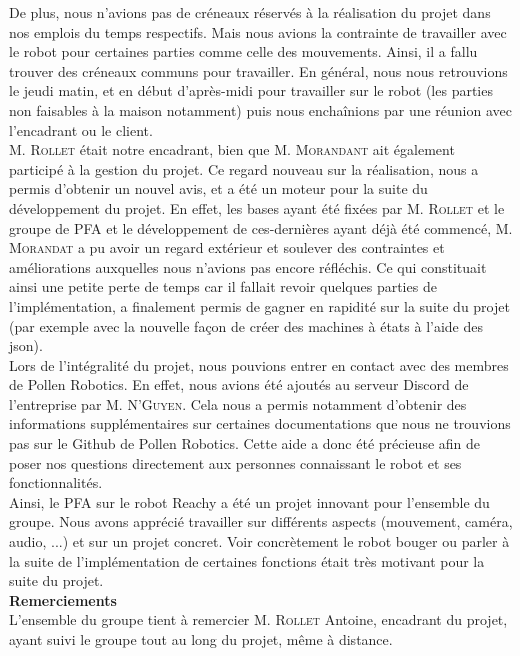 \documentclass[a4paper,french]{article}
\begin{document}
De plus, nous n'avions pas de créneaux réservés à la réalisation du projet dans nos emplois du temps respectifs. Mais nous avions la contrainte de travailler avec le robot pour certaines parties comme celle des mouvements. Ainsi, il a fallu trouver des créneaux communs pour travailler. En général, nous nous retrouvions le jeudi matin, et en début d'après-midi pour travailler sur le robot (les parties non faisables à la maison notamment) puis nous enchaînions par une réunion avec l'encadrant ou le client. \\

M. \textsc{Rollet} était notre encadrant, bien que M. \textsc{Morandant} ait également participé à la gestion du projet. Ce regard nouveau sur la réalisation, nous a permis d'obtenir un nouvel avis, et a été un moteur pour la suite du développement du projet. En effet, les bases ayant été fixées par M. \textsc{Rollet} et le groupe de PFA et le développement de ces-dernières ayant déjà été commencé, M. \textsc{Morandat} a pu avoir un regard extérieur et soulever des contraintes et améliorations auxquelles nous n'avions pas encore réfléchis. Ce qui constituait ainsi une petite perte de temps car il fallait revoir quelques parties de l'implémentation, a finalement permis de gagner en rapidité sur la suite du projet (par exemple avec la nouvelle façon de créer des machines à états à l'aide des json). \\

Lors de l'intégralité du projet, nous pouvions entrer en contact avec des membres de Pollen Robotics. En effet, nous avions été ajoutés au serveur Discord de l'entreprise par M. \textsc{N'Guyen}. Cela nous a permis notamment d'obtenir des informations supplémentaires sur certaines documentations que nous ne trouvions pas sur le Github de Pollen Robotics. Cette aide a donc été précieuse afin de poser nos questions directement aux personnes connaissant le robot et ses fonctionnalités. \\

Ainsi, le PFA sur le robot Reachy a été un projet innovant pour l'ensemble du groupe. Nous avons apprécié travailler sur différents aspects (mouvement, caméra, audio, ...) et sur un projet concret. Voir concrètement le robot bouger ou parler à la suite de l'implémentation de certaines fonctions était très motivant pour la suite du projet. \\

\textbf{Remerciements} \\

L'ensemble du groupe tient à remercier M. \textsc{Rollet} Antoine, encadrant du projet, ayant suivi le groupe tout au long du projet, même à distance.\\
\end{document}
